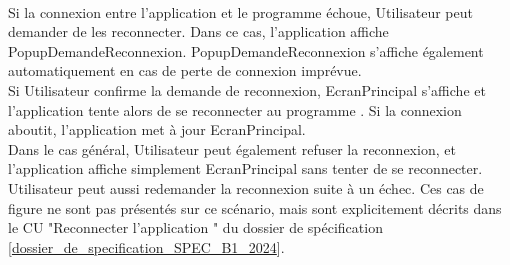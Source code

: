 \\
Si la connexion entre l'application {\nomApplication} et le programme {\nomLogiciel} échoue, Utilisateur peut demander de les reconnecter. Dans ce cas, l'application {\nomApplication} affiche PopupDemandeReconnexion. PopupDemandeReconnexion s'affiche également automatiquement en cas de perte de connexion imprévue.
\\
Si Utilisateur confirme la demande de reconnexion, EcranPrincipal s'affiche et l'application {\nomApplication} tente alors de se reconnecter au programme {\nomLogiciel}. Si la connexion aboutit, l'application {\nomApplication} met à jour EcranPrincipal. \\
Dans le cas général, Utilisateur peut également refuser la reconnexion, et l'application {\nomApplication} affiche simplement EcranPrincipal sans tenter de se reconnecter. Utilisateur peut aussi redemander la reconnexion suite à un échec. Ces cas de figure ne sont pas présentés sur ce scénario, mais sont explicitement décrits dans le CU "Reconnecter l'application {\nomApplication}" du dossier de spécification [\hyperref[SPEC]{dossier\_de\_specification\_SPEC\_B1\_2024}].